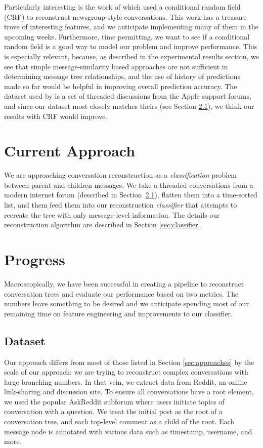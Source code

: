 \documentclass[10pt]{article}
\begin{document}
Particularly interesting is the work of \cite{Wang2011a} which used a conditional random
field (CRF) to reconstruct newsgroup-style conversations. This work has a treasure trove of
interesting features, and we anticipate implementing many of them in the upcoming weeks.
Furthermore, time permitting, we want to see if a conditional random field is a good way
to model our problem and improve performance. This is especially relevant, because, 
as described in the experimental results section, we see that simple message-similarity 
based approaches are not sufficient in determining message tree relationships, and 
the use of history of predictions made so far would be helpful in improving overall 
prediction accuracy. The dataset used by \cite{Wang2011a} is a set of threaded discussions 
from the Apple support forums, and since our dataset most 
closely matches theirs (see Section \ref{section:dataset}), we think our results with 
CRF would improve.

\section{Current Approach}
\label{sec:approach}
We are approaching conversation reconstruction as a \textit{classification} problem
between parent and children messages. We take a threaded conversations from a modern internet forum 
(described in Section~\ref{section:dataset}), flatten them into a time-sorted list, and them feed
them into our reconstruction \textit{classifier} that attempts to recreate the tree
with only message-level information. The details our reconstruction algorithm are 
described in Section \ref{sec:classifier}.

\section{Progress}
Macroscopically, we have
been successful in creating a pipeline to reconstruct conversation trees and
evaluate our performance based on two metrics. The numbers leave something to be desired and
we anticipate spending most of our remaining time on feature engineering and
improvements to our classifier.

\subsection{Dataset}
\label{section:dataset}
Our approach differs from most of those listed in Section \ref{sec:approaches}
by the scale of our approach: we are trying to reconstruct complex
conversations with large branching numbers.  In that vein, we extract data
from Reddit, an online link-sharing and discussion site. To ensure all
conversations have a root element, we used the popular AskReddit subforum
where users initiate topics of conversation with a question. We treat the
initial post as the root of a conversation tree, and each top-level comment as
a child of the root. Each message node is annotated with various data such as
timestamp, username, and more.
\end{document}
